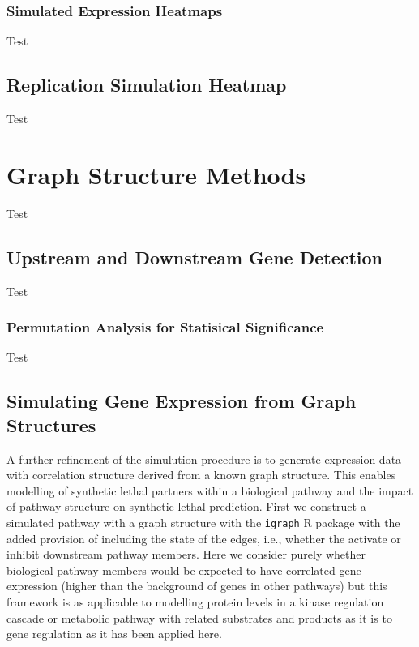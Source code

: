 
\subsubsection{Simulated Expression Heatmaps}
Test

\subsection{Replication Simulation Heatmap}
Test

\section{Graph Structure Methods}
Test

\subsection{Upstream and Downstream Gene Detection} \label{methods:pathway_str}
Test

\subsubsection{Permutation Analysis for Statisical Significance} \label{methods:network_permutation}
Test

\subsection{Simulating Gene Expression from Graph Structures} \label{methods:graphsim}
A further refinement of the simulution procedure is to generate expression data with correlation structure derived from a known graph structure. This enables modelling of synthetic lethal partners within a biological pathway and the impact of pathway structure on synthetic lethal prediction. First we construct a simulated pathway with a graph structure with the \texttt{igraph} R package with the added provision of including the state of the edges, i.e., whether the activate or inhibit downstream pathway members. Here we consider purely whether biological pathway members would be expected to have correlated gene expression (higher than the background of genes in other pathways) but this framework is as applicable to modelling protein levels in a kinase regulation cascade or metabolic pathway with related substrates and products as it is to gene regulation as it has been applied here.

